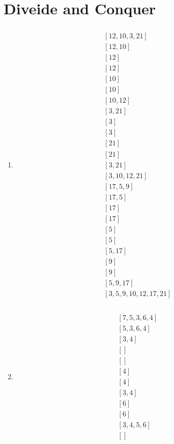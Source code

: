 \documentclass[sectionformat = exercise]{gadsescript}
\begin{document}
\section{Diveide and Conquer}
\begin{enumerate}[label=\alph*)]
	\item 
		\begin{multline*}
			[12, 10, 3, 21, 17, 5, 9]\\
			[12, 10, 3, 21]\\
			[12, 10]\\
			[12]\\
			[12]\\
			[10]\\
			[10]\\
			[10, 12]\\
			[3, 21]\\
			[3]\\
			[3]\\
			[21]\\
			[21]\\
			[3, 21]\\
			[3, 10, 12 ,21]\\
			[17, 5, 9]\\
			[17, 5]\\
			[17]\\
			[17]\\
			[5]\\
			[5]\\
			[5, 17]\\
			[9]\\
			[9]\\
			[5, 9, 17]\\
			[3, 5, 9, 10, 12, 17, 21]\\
		\end{multline*}
	\item
		\begin{multline*}
			[10, 7, 5, 15, 13, 3, 6, 11, 4]\\
			[7, 5, 3, 6, 4]\\
			[5, 3, 6, 4]\\
			[3, 4]\\
			[]\\
			[]\\
			[4]\\
			[4]\\
			[3, 4]\\
			[6]\\
			[6]\\
			[3, 4, 5, 6]\\
			[]\\

\end{multline*}
\end{enumerate}
\end{document}
